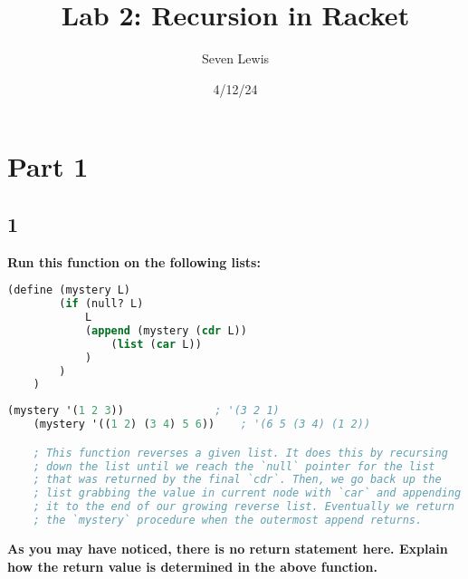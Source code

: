 \documentclass{article}
\title{Lab 2: Recursion in Racket}
\author{Seven Lewis}
\date{4/12/24}
\begin{document}
\maketitle


\section*{Part 1}
\subsection*{1}
\begin{adjustwidth}{2em}{0em}
    \textbf{Run this function on the following lists:} 
\end{adjustwidth}

\begin{lstlisting}[language=lisp]
    (define (mystery L) 
        (if (null? L)
            L
            (append (mystery (cdr L))
                (list (car L))
            )
        )
    )
\end{lstlisting}

\begin{lstlisting}[language=lisp,style=redStyle]
    (mystery '(1 2 3))              ; '(3 2 1)
    (mystery '((1 2) (3 4) 5 6))    ; '(6 5 (3 4) (1 2))

    ; This function reverses a given list. It does this by recursing
    ; down the list until we reach the `null` pointer for the list
    ; that was returned by the final `cdr`. Then, we go back up the
    ; list grabbing the value in current node with `car` and appending
    ; it to the end of our growing reverse list. Eventually we return 
    ; the `mystery` procedure when the outermost append returns. 
\end{lstlisting}

\begin{adjustwidth}{2em}{0em}
    \textbf{As you may have noticed, there is no return statement here. Explain how the return value is determined in the above function.} 
\end{adjustwidth}
\end{document}
